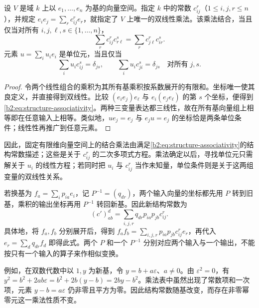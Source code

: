 \begin{proposition}\label{b2:prop:structure-constants}
	设 \(V\) 是域 \(k\) 上以 \(e_1,\ldots,e_n\) 为基的向量空间。指定 \(k\) 中的常数 \(c_{ij}^{r}\)（\(1\le i,j,r\le n\)），并规定 \(e_ie_j=\sum_r c_{ij}^{r}e_r\)，就指定了 \(V\) 上唯一的双线性乘法。该乘法结合，当且仅当对所有 \(i,j,\ell,s\in\{1,\ldots,n\}\)，
	\begin{equation}\label{b2:eq:structure-associativity}
		\sum_r c_{ij}^{r}c_{r\ell}^{s}=\sum_r c_{j\ell}^{r}c_{ir}^{s}.
	\end{equation}
	元素 \(u=\sum_i u_i e_i\) 是单位元，当且仅当
	\[
		\sum_i u_i c_{ij}^{s}=\delta_{js},\qquad \sum_i u_i c_{ji}^{s}=\delta_{js} \quad\text{对所有}\;j,s.
	\]
\end{proposition}
\begin{proof}
	令两个线性组合的乘积为其所有基乘积按系数展开的有限和。坐标唯一使其良定义，并直接得到双线性。比较 \((e_ie_j)e_\ell\) 与 \(e_i(e_je_\ell)\) 的第 \(s\) 个坐标，便得到\eqref{b2:eq:structure-associativity}。两种三变量表达都三线性，故在所有基向量组上相等即在任意输入上相等。类似地，\(ue_j=e_j\) 与 \(e_ju=e_j\) 的坐标恰是两条单位条件；线性性再推广到任意元素。
\end{proof}

因此，固定有限维向量空间上的结合乘法由满足\eqref{b2:eq:structure-associativity}的结构常数描述；这些是关于 \(c_{ij}^{r}\) 的二次多项式方程。乘法确定以后，寻找单位元只需解关于 \(u_i\) 的线性方程；若同时把 \(u_i\) 与 \(c_{ij}^{r}\) 当作未知量，单位条件则是关于这两组变量的双线性关系。

\ProseParagraphBreak
若换基为 \(f_a=\sum_i p_{ia}e_i\)，记 \(P^{-1}=(q_{dr})\)，两个输入向量的坐标都先用 \(P\) 转到旧基，乘积的输出坐标再用 \(P^{-1}\) 转回新基。因此新结构常数为
\begin{equation}\label{b2:eq:structure-basis-change}
	(c')_{ab}^{d}=\sum_{i,j,r}q_{dr}p_{ia}p_{jb}c_{ij}^{r}.
\end{equation}
具体地，将 \(f_a,f_b\) 分别展开后，得到 \(f_af_b=\sum_{i,j,r}p_{ia}p_{jb}c_{ij}^{r}e_r\)，再代入 \(e_r=\sum_dq_{dr}f_d\) 即得此式。两个 \(P\) 和一个 \(P^{-1}\) 分别对应两个输入与一个输出，不能按只有一个输入的算子来作相似变换。

\ProseParagraphBreak
例如，在双数代数中以 \(1,y\) 为新基，令 \(y=b+a\varepsilon\)、\(a\ne0\)。由 \(\varepsilon^2=0\)，有 \(y^2=b^2+2ab\varepsilon=b^2+2b(y-b)=2by-b^2\)。乘法表中虽然出现了常数项和一次项，元素 \(y-b=a\varepsilon\) 仍非零且平方为零。因此结构常数随基改变，而存在非零幂零元这一乘法性质不变。

